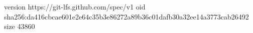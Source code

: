 version https://git-lfs.github.com/spec/v1
oid sha256:da416cbcae601e2e64c35b3e86272a89b36c01dafb30a32ee14a3773cab26492
size 43860
